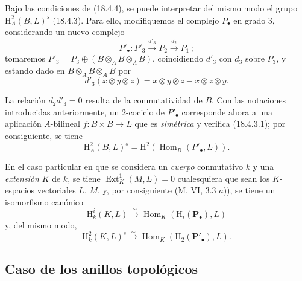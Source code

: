 \begin{env}[18.4.5]
\label{0.18.4.5-es}
Bajo las condiciones de (18.4.4), se puede interpretar del mismo modo el
grupo $\mathrm H_A^2(B,L)^s$ (18.4.3). Para ello, modifiquemos el complejo
$P_\bullet$ en grado $3$, considerando un nuevo complejo
\[
  P'_\bullet:P'_3\xrightarrow{d'_3}P_2
  \xrightarrow{d_2}P_1\,;
\]
tomaremos
$P'_3=P_3\oplus(B\otimes_A B\otimes_A B)$, coincidiendo
$d'_3$ con $d_3$ sobre $P_3$, y estando dado en
$B\otimes_A B\otimes_A B$ por
\[
  d'_3(x\otimes y\otimes z)=x\otimes y\otimes z-x\otimes z\otimes y.
\]

La relación $d_2d'_3=0$ resulta de la conmutatividad de $B$. Con las notaciones
introducidas anteriormente, un $2$-cociclo de $P'_\bullet$ corresponde
ahora a una aplicación $A$-bilineal $f:B\times B\to L$ que es
\emph{simétrica} y verifica (18.4.3.1); por consiguiente, se tiene
\[
  \mathrm H_A^2(B,L)^s
  =\mathrm H^2(\operatorname{Hom}_B(P'_\bullet,L)).
\]
\end{env}

\begin{env}[18.4.6]
\label{0.18.4.6-es}
En el caso particular en que se considera un \emph{cuerpo} conmutativo $k$ y
una \emph{extensión} $K$ de $k$, se tiene
$\operatorname{Ext}_K^1(M,L)=0$ cualesquiera que sean los $K$-espacios
vectoriales $L$, $M$, y, por consiguiente (M, VI, 3.3 $a$)), se tiene un
isomorfismo canónico
\begin{equation}
\label{0.18.4.6.1-es}
\tag{18.4.6.1}
  \mathrm H_k^i(K,L)\xrightarrow{\sim}
  \operatorname{Hom}_K(\mathrm H_i(\mathbf P_\bullet),L)
\end{equation}
y, del mismo modo,
\begin{equation}
\label{0.18.4.6.2-es}
\tag{18.4.6.2}
  \mathrm H_k^2(K,L)^s\xrightarrow{\sim}
  \operatorname{Hom}_K(\mathrm H_2(\mathbf P'_\bullet),L).
\end{equation}
\end{env}

\subsection{Caso de los anillos topológicos}
\label{subsection:0.18.5-es}

